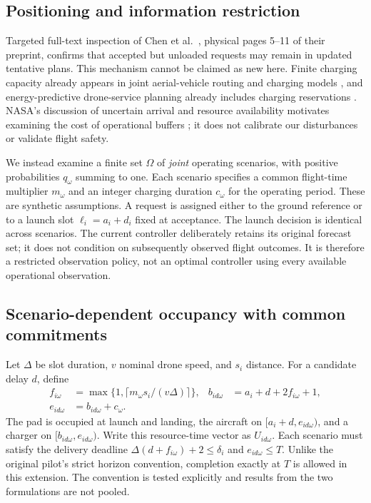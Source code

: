 \documentclass[11pt,a4paper]{article}
\begin{document}
\subsection{Positioning and information restriction}
Targeted full-text inspection of Chen et al.\ \cite{chen}, physical pages 5--11 of their preprint, confirms that accepted but unloaded requests may remain in updated tentative plans. This mechanism cannot be claimed as new here. Finite charging capacity already appears in joint aerial-vehicle routing and charging models \cite{chencharging}, and energy-predictive drone-service planning already includes charging reservations \cite{ren}. NASA's discussion of uncertain arrival and resource availability motivates examining the cost of operational buffers \cite{nasa}; it does not calibrate our disturbances or validate flight safety.

We instead examine a finite set $\Omega$ of \emph{joint} operating scenarios, with positive probabilities $q_\omega$ summing to one. Each scenario specifies a common flight-time multiplier $m_\omega$ and an integer charging duration $c_\omega$ for the operating period. These are synthetic assumptions. A request is assigned either to the ground reference or to a launch slot $\ell_i=a_i+d_i$ fixed at acceptance. The launch decision is identical across scenarios. The current controller deliberately retains its original forecast set; it does not condition on subsequently observed flight outcomes. It is therefore a restricted observation policy, not an optimal controller using every available operational observation.

\subsection{Scenario-dependent occupancy with common commitments}
Let $\Delta$ be slot duration, $v$ nominal drone speed, and $s_i$ distance. For a candidate delay $d$, define
\begin{align}
 f_{i\omega}&=\max\{1,\lceil m_\omega s_i/(v\Delta)\rceil\}, &
 b_{id\omega}&=a_i+d+2f_{i\omega}+1,\\
 e_{id\omega}&=b_{id\omega}+c_\omega.&&
\end{align}
The pad is occupied at launch and landing, the aircraft on $[a_i+d,e_{id\omega})$, and a charger on $[b_{id\omega},e_{id\omega})$. Write this resource-time vector as $U_{id\omega}$. Each scenario must satisfy the delivery deadline $\Delta(d+f_{i\omega})+2\leq\delta_i$ and $e_{id\omega}\leq T$. Unlike the original pilot's strict horizon convention, completion exactly at $T$ is allowed in this extension. The convention is tested explicitly and results from the two formulations are not pooled.
\end{document}
